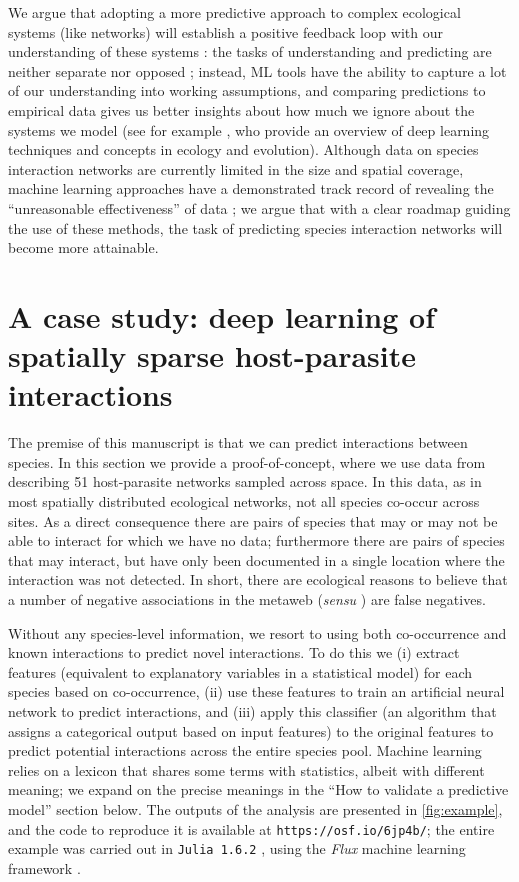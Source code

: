 We argue that adopting a more predictive approach to complex ecological
systems (like networks) will establish a positive feedback loop with our
understanding of these systems \cite{Houlahan2017PriPre}: the tasks of
understanding and predicting are neither separate nor opposed
\cite{Maris2017PreEco}; instead, ML tools have the ability to capture a
lot of our understanding into working assumptions, and comparing
predictions to empirical data gives us better insights about how much we
ignore about the systems we model (see for example
\cite{Borowiec2021DeeLea}, who provide an overview of deep learning techniques
and concepts in ecology and evolution). Although data on species
interaction networks are currently limited in the size and spatial
coverage, machine learning approaches have a demonstrated track record
of revealing the ``unreasonable effectiveness'' of data
\cite{Halevy2009UnrEff}; we argue that with a clear roadmap guiding the
use of these methods, the task of predicting species interaction
networks will become more attainable.

\section{A case study: deep learning of spatially sparse host-parasite
interactions}\label{a-case-study-deep-learning-of-spatially-sparse-host-parasite-interactions}

The premise of this manuscript is that we can predict interactions
between species. In this section we provide a proof-of-concept, where we
use data from \cite{Hadfield2014TalTwo} describing 51 host-parasite networks
sampled across space. In this data, as in most spatially distributed
ecological networks, not all species co-occur across sites. As a direct
consequence there are pairs of species that may or may not be able to
interact for which we have no data; furthermore there are pairs of
species that may interact, but have only been documented in a single
location where the interaction was not detected. In short, there are
ecological reasons to believe that a number of negative associations in
the metaweb (\emph{sensu} \cite{Dunne2006NetStr}) are false negatives.

Without any species-level information, we resort to using both
co-occurrence and known interactions to predict novel interactions. To
do this we (i) extract features (equivalent to explanatory variables in
a statistical model) for each species based on co-occurrence, (ii) use
these features to train an artificial neural network to predict
interactions, and (iii) apply this classifier (an algorithm that assigns
a categorical output based on input features) to the original features
to predict potential interactions across the entire species pool.
Machine learning relies on a lexicon that shares some terms with
statistics, albeit with different meaning; we expand on the precise
meanings in the ``How to validate a predictive model'' section below.
The outputs of the analysis are presented in \autoref{fig:example}, and the code
to reproduce it is available at \texttt{https://osf.io/6jp4b/}; the
entire example was carried out in \texttt{Julia 1.6.2}
\cite{Bezanson2017JulFre}, using the \emph{Flux} machine learning
framework \cite{Innes2018FluEle}.

